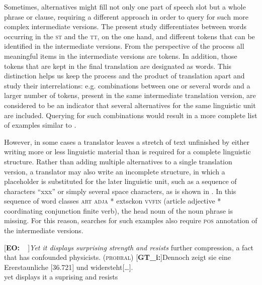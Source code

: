 \documentclass[output=paper]{LSP/langsci}
\begin{document}
Sometimes, alternatives might fill not only one part of speech slot but a whole phrase or clause, requiring a different approach in order to query for such more complex intermediate versions. The present study differentiates between words occurring in the \textsc{st} and the \textsc{tt}, on the one hand, and different tokens that can be identified in the intermediate versions. From the perspective of the process all meaningful items in the intermediate versions are tokens. In addition, those tokens that are kept in the final translation are designated as words. This distinction helps us keep the process and the product of translation apart and study their interrelations: e.g. combinations between one or several words and a larger number of tokens, present in the same intermediate translation version, are considered to be an indicator that several alternatives for the same linguistic unit are included. Querying for such combinations would result in a more complete list of examples similar to .
 
However, in some cases a translator leaves a stretch of text unfinished by either writing more or less linguistic material than is required for a complete linguistic structure. Rather than adding multiple alternatives to a single translation version, a translator may also write an incomplete structure, in which a placeholder is substituted for the later linguistic unit, such as a sequence of characters “xxx” or simply several space characters, as is shown in . In this sequence of word classes \textsc{art} \textsc{adja} * 	extsc{kon} \textsc{vvfin} (article adjective * coordinating conjunction finite verb), the head noun of the noun phrase is missing. For this reason, searches for such examples also require \textsc{pos} annotation of the intermediate versions.



\ea \label{ex:1:5}
\begin{xlist}
\exi{}[\textbf{EO:~~}]{\emph{Yet it displays surprising strength and resists} further compression, a fact that has confounded physicists. (\textsc{probral})}
\exi{}[\textbf{GT\_i:}]{\gll  Denno\stern{}ch\raute\stern\stern\stern\stern\stern{} zeigt\stern\raute{} sie\raute{} eine\raute{} Er\pfeil\pfeil\pfeil\raute{}erstaun\stern\stern{}liche\raute{} [\stern{}36.721] \raute\raute\stern{} und\raute\stern\stern\stern\stern\stern\stern{} widersteht[{\dots}].\\
 yet displays it a suprising\raute{}\raute{}\raute{} {} \raute{}\raute{} and resists \\
}
\end{xlist}
\z
\end{document}
